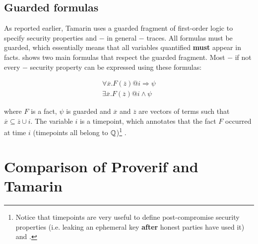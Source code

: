 \subsection{Guarded formulas}
\label{sub:guarded-formulas}

As reported earlier, Tamarin uses a guarded fragment of first-order logic to specify security properties and $-$ in general $-$ traces. All formulas must be guarded, which essentially means that all variables quantified \textbf{must} appear in facts.  shows two main formulas that respect the guarded fragment. Most $-$ if not every $-$ security property can be expressed using these formulas:

\begin{equation}
  \label{eq:guarded-formulas}
  \begin{gathered}
    \forall \overline{x}. F\left(\overline{z}\right) @i \Rightarrow \psi \\
    \exists \overline{x}. F\left(\overline{z}\right) @i \land \psi
  \end{gathered}
\end{equation}

where $F$ is a fact, $\psi$ is guarded and $\overline{x}$ and $\overline{z}$ are vectors of terms such that $\overline{x} \subseteq \overline{z} \cup i$.
The variable $i$ is a timepoint, which annotates that the fact $F$ occurred at time $i$ (timepoints all belong to $\mathbb{Q}$)\footnote{Notice that timepoints are very useful to define post-compromise security properties (i.e. leaking an ephemeral key \textbf{after} honest parties have used it) and \pfs{}.} \cite{TamarinTeachingSlides}.

\section{Comparison of Proverif and Tamarin}
\label{section:proverif-vs-tamarin}

